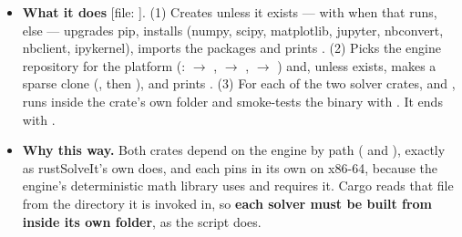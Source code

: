 \begin{itemize}
  \item \textbf{What it does} [file: ]. (1) Creates  unless it exists --- with  when that runs, else  --- upgrades pip, installs  (numpy, scipy, matplotlib, jupyter, nbconvert, nbclient, ipykernel), imports the packages and prints . (2) Picks the engine repository for the platform (:  $\to$ ,  $\to$ ,  $\to$ ) and, unless  exists, makes a sparse clone (, then ), and prints . (3) For each of the two solver crates,  and , runs  inside the crate's own folder and smoke-tests the binary with . It ends with .
  \item \textbf{Why this way.} Both crates depend on the engine by path ( and ), exactly as rustSolveIt's own  does, and each pins  in its own  on x86-64, because the engine's deterministic math library uses  and requires it. Cargo reads that file from the directory it is invoked in, so \textbf{each solver must be built from inside its own folder}, as the script does.

\end{itemize}
